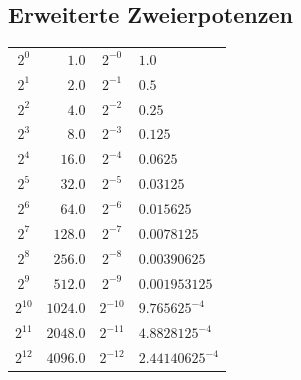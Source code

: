 \subsection{Erweiterte Zweierpotenzen}
\begin{center}
    \begin{tabular}{|cr||cl|}
        \hline
        \rowcolor{primaryheader!15}$2^{0}$ & $1.0$ & $2^{-0}$ & $ 1.0$ \\ 
        $2^{1}$ & $2.0$ & $2^{-1}$ & $ 0.5$ \\ 
        $2^{2}$ & $4.0$ & $2^{-2}$ & $ 0.25$ \\ 
        $2^{3}$ & $8.0$ & $2^{-3}$ & $ 0.125$ \\ 
        $2^{4}$ & $16.0$ & $2^{-4}$ & $ 0.0625$ \\ 
        $2^{5}$ & $32.0$ & $2^{-5}$ & $ 0.03125$ \\ 
        $2^{6}$ & $64.0$ & $2^{-6}$ & $ 0.015625$ \\ 
        $2^{7}$ & $128.0$ & $2^{-7}$ & $ 0.0078125$ \\ 
        $2^{8}$ & $256.0$ & $2^{-8}$ & $ 0.00390625$ \\ 
        $2^{9}$ & $512.0$ & $2^{-9}$ & $ 0.001953125$ \\ 
        $2^{10}$ & $1024.0$ & $2^{-10}$ & $ 9.765625^{-4}$ \\ 
        $2^{11}$ & $2048.0$ & $2^{-11}$ & $ 4.8828125^{-4}$ \\ 
        $2^{12}$ & $4096.0$ & $2^{-12}$ & $ 2.44140625^{-4}$ \\ 
        \hline                
    \end{tabular}
\end{center}
